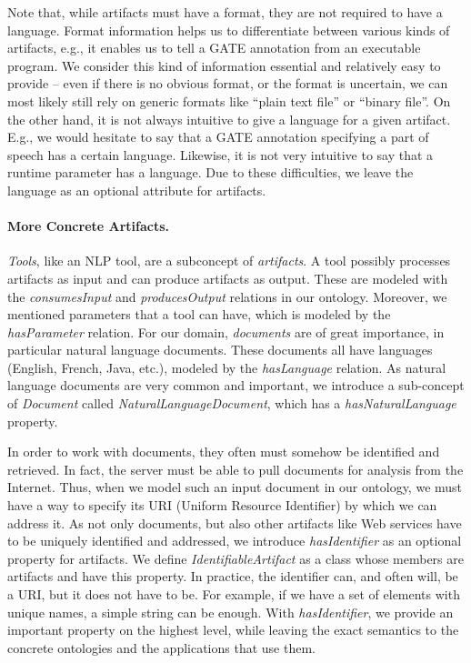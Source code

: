 Note that, while artifacts must have a format, they are not required
to have a language. Format information helps us to differentiate
between various kinds of artifacts, e.g., it enables us to tell a GATE
annotation from an executable program. We consider this kind of
information essential and relatively easy to provide -- even if there
is no obvious format, or the format is uncertain, we can most likely
still rely on generic formats like ``plain text file'' or ``binary
file''. On the other hand, it is not always intuitive to give a
language for a given artifact. E.g., we would hesitate to say that a
GATE annotation specifying a part of speech has a certain language.
Likewise, it is not very intuitive to say that a runtime parameter has
a language. Due to these difficulties, we leave the language as an
optional attribute for artifacts.

\paragraph{More Concrete Artifacts.} \emph{Tools}, like an NLP tool,
are a subconcept of \emph{artifacts}. A tool possibly processes
artifacts as input and can produce artifacts as output. These are
modeled with the \emph{consumesInput} and \emph{producesOutput}
relations in our ontology. Moreover, we mentioned parameters that a
tool can have, which is modeled by the \emph{hasParameter}
relation. For our domain, \emph{documents} are of great importance, in
particular natural language documents. These documents all have
languages (English, French, Java, etc.), modeled by the
\emph{hasLanguage} relation. As natural language documents are very
common and important, we introduce a sub-concept of \emph{Document}
called \emph{NaturalLanguageDocument}, which has a
\emph{hasNaturalLanguage} property.

In order to work with documents, they often must somehow be identified
and retrieved. In fact, the \sa server must be able to pull documents
for analysis from the Internet.  Thus, when we model such an input
document in our ontology, we must have a way to specify its URI
(Uniform Resource Identifier) by which we can address it. As not only
documents, but also other artifacts like Web services have to be
uniquely identified and addressed, we introduce \emph{hasIdentifier}
as an optional property for artifacts.  We define
\emph{IdentifiableArtifact} as a class whose members are artifacts and
have this property. In practice, the identifier can, and often will,
be a URI, but it does not have to be. For example, if we have a set of
elements with unique names, a simple string can be enough. With
\emph{hasIdentifier}, we provide an important property on the highest
level, while leaving the exact semantics to the concrete ontologies
and the applications that use them.

